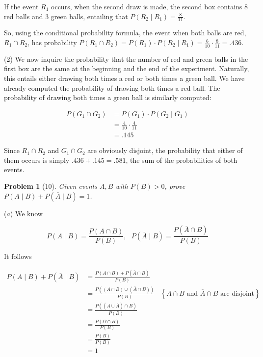 \documentclass[a4paper, 12pt]{article}
\newtheorem{problem}{Problem}
\newtheorem{problem}{Problem}
\begin{document}
   If the event $R_1$ occurs, when the second draw is made, the second box 
   contains $8$ red balls and $3$ green balls, entailing that 
   $P(R_2 \mid  R_1) = \frac{8}{11} $.

   So, using the conditional probability formula, the event when both balls are
   red, $R_1 \cap R_2$, has probability $P(R_1 \cap R_2) = P(R_1) \cdot P(R_2
   \mid R_1) = \frac{6}{10} \cdot \frac{8}{11} = .436$.

   (2) We now inquire the probability that the number of red and green balls in the 
   first box are the same at the beginning and the end of the experiment. Naturally, 
   this entails either drawing both times a red or both times a green ball. We have 
   already computed the probability of drawing both times a red ball. The probability 
   of drawing both times a green ball is similarly computed: 

   \begin{align*}
       P(G_1 \cap G_2) &= P(G_1) \cdot P(G_2 \mid G_1) \\ 
       &= \frac{4}{10} \cdot \frac{4}{11} \\ 
       &= .145
   \end{align*}


   Since $R_1 \cap R_2$ and $G_1 \cap G_2$ are obviously disjoint, the probability that 
   either of them occurs is simply $.436 + .145 = .581$, the sum of the probabilities 
   of both events.

   \pagebreak 


   \begin{problem}[10]
       Given events $A, B$ with $P(B) > 0$, prove $P(A \mid B) + P(\overline{A} \mid B) = 1$.
   \end{problem}

   ($a$) We know 

   \begin{equation*}
       P(A \mid B) = \frac{P(A \cap B)}{P(B)}, ~ ~ ~ P(\overline{A} \mid B) = \frac{P(\overline{A} \cap B)}{P(B)}
   \end{equation*}

   It follows 

   \begin{align*}
       P(A \mid B) + P(\overline{A} \mid B) &= \frac{P(A \cap B) + P(\overline{A} \cap B)}{P(B)}  \\ 
                                            &= \frac{P\left((A \cap B) \cup (\overline{A} \cap B)\right)}{P(B)} &\left\{ A \cap B \text{  and } \overline{A} \cap B \text{ are disjoint}\right\} \\ 
                                            &= \frac{ P\left( ( A \cup \overline{A} ) \cap B \right)    }{P(B)} \\ 
                                            &= \frac{ P(\Omega \cap B) }{P(B)} \\ 
                                            &= \frac{P(B)}{P(B)} \\ 
                                            &= 1
   \end{align*}
\end{document}
